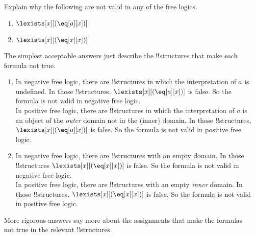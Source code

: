 \documentclass[../../../include/open-logic-section]{subfiles}
\begin{document}


\begin{prob}[Semantics]
Explain why the following are not valid in any of the free logics.
\begin{enumerate}
\item $\lexists[x][(\eq[a][x])]$
\item $\lexists[x][(\eq[x][x])]$
\end{enumerate}
\begin{ans}
The simplest acceptable answers just describe the !!{structure}s that
make each formula not true. 
\begin{enumerate}
\item In negative free logic, there are !!{structure}s in which the
	interpretation of $a$ is undefined. In those !!{structure}s,
	$\lexists[x][(\eq[a][x])]$ is false. So the formula is not valid
	in negative free logic.\\
	In positive free logic, there are !!{structure}s in which the
	interpretation of $a$ is an object of the \emph{outer} domain not
	in the (inner) domain. In those !!{structure}s,
	$\lexists[x][(\eq[a][x])]$ is false. So the formula is not valid
	in positive free logic.
\item In negative free logic, there are !!{structure}s with an empty
	domain. In those !!{structure}s $\lexists[x][(\eq[x][x])]$ is
	false. So the formula is not valid in negative free logic. \\
	In positive free logic, there are !!{structure}s with an empty
	\emph{inner} domain. In those !!{structure}s,
	$\lexists[x][(\eq[x][x])]$ is false. So the formula is not valid
	in positive free logic. 
\end{enumerate}
More rigorous answers say more about the assignments that make the
formulas not true in the relevant !!{structure}s. 

\end{ans}
\end{prob}
\end{document}
